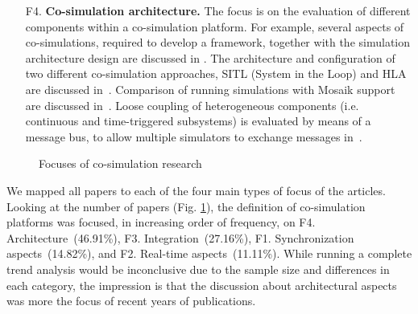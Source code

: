 \documentclass[1p]{elsarticle} %
\begin{document}
\begin{enumerate}
    \item[{F}4.] \textbf{Co-simulation architecture.} The focus is on the evaluation of different components within a co-simulation platform. For example, several aspects of co-simulations, required to develop a framework, together with the simulation architecture design are discussed in . The architecture and configuration of two different co-simulation approaches, SITL (System in the Loop) and HLA are discussed in~. Comparison of running simulations with Mosaik support are discussed in~. Loose coupling of heterogeneous components (i.e. continuous and time-triggered subsystems) is evaluated by means of a message bus, to allow multiple simulators to exchange messages in~.
    
\end{enumerate}

\begin{figure}[!htb]
\centering
{}
\caption{Focuses of co-simulation research}
\label{fig:focus-co-sim}
\end{figure}

We mapped all papers to each of the four main types of focus of the articles. Looking at the number of papers (Fig. \ref{fig:focus-co-sim}), the definition of co-simulation platforms was focused, in increasing order of frequency, on F4. Architecture~(46.91\%), F3. Integration~(27.16\%), F1. Synchronization aspects~(14.82\%), and F2. Real-time aspects~(11.11\%). While running a complete trend analysis would be inconclusive due to the sample size and differences in each category, the impression is that the discussion about architectural aspects was more the focus of recent years of publications.
\end{document}
